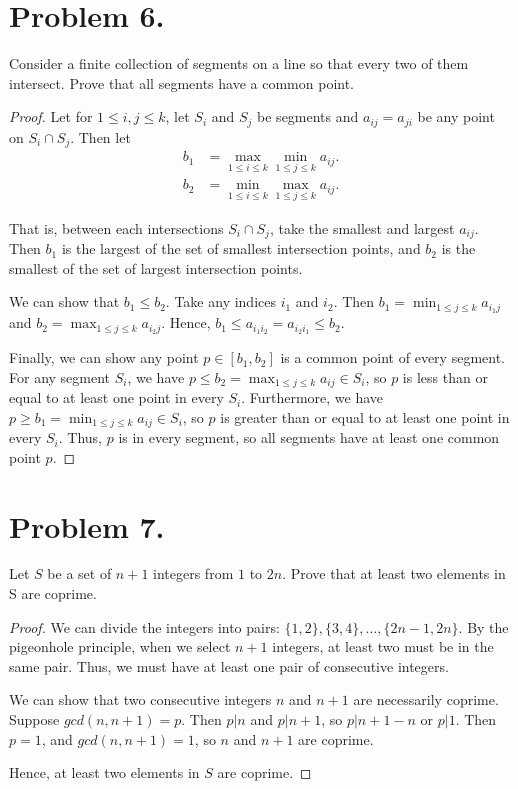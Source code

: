 \documentclass{article}
\begin{document}
\section{Problem 6.}
Consider a finite collection of segments on a line so that every two of them intersect. Prove that all segments have a common point.
\begin{proof}
Let for $1\leq i,j\leq k$, let $S_i$ and $S_j$ be segments and $a_{ij}=a_{ji}$ be any point on $S_i \cap S_j$. Then let 
\begin{align*}
    b_1&=\max_{1 \leq i \leq k}\min_{1 \leq j \leq k}a_{ij}.\\ 
    b_2&=\min_{1 \leq i \leq k}\max_{1 \leq j \leq k}a_{ij}.
\end{align*}
\par That is, between each intersections $S_i \cap S_j$, take the smallest and largest $a_{ij}$. Then $b_1$ is the largest of the set of smallest intersection points, and $b_2$ is the smallest of the set of largest intersection points.
\par We can show that $b_1 \leq b_2$. Take any indices $i_1$ and $i_2$. Then $b_1=\min_{1 \leq j \leq k}a_{i_1j}$ and $b_2=\max_{1 \leq j \leq k}a_{i_2j}$. Hence, $b_1\leq a_{i_1i_2} = a_{i_2i_1}\leq b_2$.
\par Finally, we can show any point $p\in [b_1,b_2]$ is a common point of every segment. For any segment $S_i$, we have $p\leq b_2=\max_{1 \leq j \leq k}a_{ij} \in S_i$, so $p$ is less than or equal to at least one point in every $S_i$. Furthermore, we have $p\geq b_1=\min_{1 \leq j \leq k}a_{ij} \in S_i$, so $p$ is greater than or equal to at least one point in every $S_i$. Thus, $p$ is in every segment, so all segments have at least one common point $p$.
\end{proof}


\section{Problem 7.}
Let $S$ be a set of $n+1$ integers from $1$ to $2n$. Prove that at least two elements in S are coprime.
\begin{proof}
We can divide the integers into pairs: $\{1,2\},\{3,4\},\dots,\{2n-1,2n\}$. By the pigeonhole principle, when we select $n+1$ integers, at least two must be in the same pair. Thus, we must have at least one pair of consecutive integers.
\par We can show that two consecutive integers $n$ and $n+1$ are necessarily coprime. Suppose $gcd(n,n+1)=p$. Then $p|n$ and $p|n+1$, so $p|n+1-n$ or $p|1$. Then $p=1$, and $gcd(n,n+1)=1$, so $n$ and $n+1$ are coprime. 
\par Hence, at least two elements in $S$ are coprime. 
\end{proof}
\end{document}
